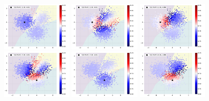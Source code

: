     \begin{figure}[ht]
        \centering
        \includegraphics[width=0.32\textwidth]{c4_figures/test_kernel_example_class_00_sample_00.pdf}
        \includegraphics[width=0.32\textwidth]{c4_figures/test_kernel_example_class_01_sample_00.pdf}
        \includegraphics[width=0.32\textwidth]{c4_figures/test_kernel_example_class_02_sample_00.pdf}\\
        
        \includegraphics[width=0.32\textwidth]{c4_figures/test_kernel_example_class_00_sample_01.pdf}
        \includegraphics[width=0.32\textwidth]{c4_figures/test_kernel_example_class_01_sample_01.pdf}
        \includegraphics[width=0.32\textwidth]{c4_figures/test_kernel_example_class_02_sample_01.pdf}\\


\end{figure}

